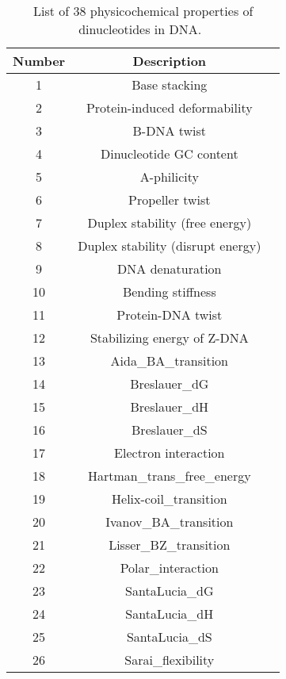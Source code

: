 \begin{footnotesize}
    \begin{longtable}{ccc}
        \caption{List of 38 physicochemical properties of dinucleotides in DNA.~\cite{Chen2014PseKNC:Composition}}
        \label{tab:38_di}
        \endfirsthead
        \endhead
        \toprule
        \textbf{Number} & \textbf{Description}\\\midrule
        
        1 & Base stacking	\\\midrule
        2 & Protein-induced deformability	\\\midrule
        3 & B-DNA twist	\\\midrule
        4 & Dinucleotide GC content	\\\midrule
        5 & A-philicity	\\\midrule
        6 & Propeller twist	\\\midrule
        7 & Duplex stability (free energy)	\\\midrule
        8 & Duplex stability (disrupt energy)	\\\midrule
        9 & DNA denaturation	\\\midrule
        10 & Bending stiffness	\\\midrule
        11 & Protein-DNA twist	\\\midrule
        12 & Stabilizing energy of Z-DNA	\\\midrule
        13 & Aida\_BA\_transition	\\\midrule
        14 & Breslauer\_dG	\\\midrule
        15 & Breslauer\_dH	\\\midrule
        16 & Breslauer\_dS	\\\midrule
        17 & Electron interaction	\\\midrule
        18 & Hartman\_trans\_free\_energy	\\\midrule
        19 & Helix-coil\_transition	\\\midrule
        20 & Ivanov\_BA\_transition	\\\midrule
        21 & Lisser\_BZ\_transition	\\\midrule
        22 & Polar\_interaction	\\\midrule
        23 & SantaLucia\_dG	\\\midrule
        24 & SantaLucia\_dH	\\\midrule
        25 & SantaLucia\_dS	\\\midrule
        26 & Sarai\_flexibility	\\\midrule

\end{longtable}
\end{footnotesize}
